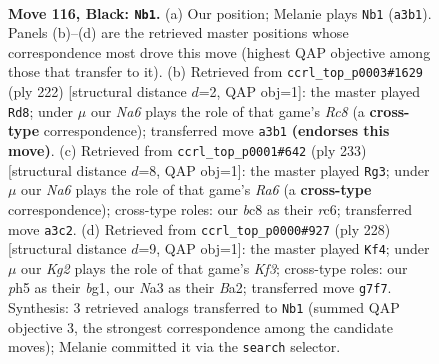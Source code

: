 \documentclass[11pt]{article}
\begin{document}
\clearpage

\begin{figure}[p]\centering
\begin{subfigure}{0.46\textwidth}\centering
\resizebox{\linewidth}{!}{%
\newchessgame
\chessboard[
  setfen={2B5/6k1/8/6PP/8/n5K1/8/8 b - - 2 116},
  showmover=false,
  pgfstyle=straightmove, color=movearrow, markmove={a3-b1}
]}
\caption{}
\end{subfigure}\hfill
\begin{subfigure}{0.46\textwidth}\centering
\resizebox{\linewidth}{!}{%
\newchessgame
\chessboard[
  setfen={2R5/8/6b1/4k3/8/5pp1/8/5K2 w - - 74 112},
  showmover=false,
  pgfstyle=straightmove, color=movearrow, markmove={c8-d8}
]}
\caption{}
\end{subfigure}
\\[4pt]
\begin{subfigure}{0.46\textwidth}\centering
\resizebox{\linewidth}{!}{%
\newchessgame
\chessboard[
  setfen={8/6k1/2R5/5PP1/7p/r7/5K2/8 b - - 0 117},
  showmover=false,
  pgfstyle=straightmove, color=movearrow, markmove={a3-g3}
]}
\caption{}
\end{subfigure}\hfill
\begin{subfigure}{0.46\textwidth}\centering
\resizebox{\linewidth}{!}{%
\newchessgame
\chessboard[
  setfen={8/4k3/8/4Pp2/8/5K2/B7/6b1 w - - 3 115},
  showmover=false,
  pgfstyle=straightmove, color=movearrow, markmove={f3-f4}
]}
\caption{}
\end{subfigure}
\caption{\textbf{Move 116, Black: \texttt{Nb1}.} (a) Our position; Melanie plays \texttt{Nb1} (\texttt{a3b1}). Panels (b)--(d) are the retrieved master positions whose correspondence most drove this move (highest QAP objective among those that transfer to it). (b) Retrieved from \texttt{ccrl\_top\_p0003\#1629} (ply 222) [structural distance $d$=2, QAP obj=1]: the master played \texttt{Rd8}; under $\mu$ our \emph{Na6} plays the role of that game's \emph{Rc8} (a \textbf{cross-type} correspondence); transferred move \texttt{a3b1} \textbf{(endorses this move)}. (c) Retrieved from \texttt{ccrl\_top\_p0001\#642} (ply 233) [structural distance $d$=8, QAP obj=1]: the master played \texttt{Rg3}; under $\mu$ our \emph{Na6} plays the role of that game's \emph{Ra6} (a \textbf{cross-type} correspondence); cross-type roles: our \emph{b}c8 as their \emph{r}c6; transferred move \texttt{a3c2}. (d) Retrieved from \texttt{ccrl\_top\_p0000\#927} (ply 228) [structural distance $d$=9, QAP obj=1]: the master played \texttt{Kf4}; under $\mu$ our \emph{Kg2} plays the role of that game's \emph{Kf3}; cross-type roles: our \emph{p}h5 as their \emph{b}g1, our \emph{N}a3 as their \emph{B}a2; transferred move \texttt{g7f7}. Synthesis: 3 retrieved analogs transferred to \texttt{Nb1} (summed QAP objective 3, the strongest correspondence among the candidate moves); Melanie committed it via the \texttt{search} selector.}
\label{fig:thought-m231}
\end{figure}
\end{document}

